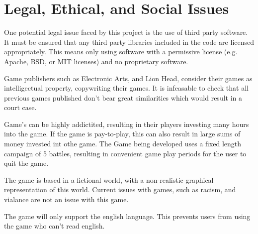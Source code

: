 \section{Legal, Ethical, and Social Issues}
\label{section:professional_issues}

One potential legal issue faced by this project is the use of third party software.
It must be ensured that any third party libraries included in the code are licensed
appropriately. This means only using software with a permissive license (e.g. Apache, BSD, or MIT licenses) and no proprietary software.

Game publishers such as Electronic Arts, and Lion Head, consider their games as intelligectual property, copywriting their games.
It is infeasable to check that all previous games published don't bear great similarities which would result in a court case.

Game's can be highly addictited, resulting in their players investing many hours into the game.
If the game is pay-to-play, this can also result in large sums of money invested int othe game.
The Game being developed uses a fixed length campaign of 5 battles, resulting in convenient game play periods for the user to quit the game.  

The game is based in a fictional world, with a non-realistic graphical representation of this world. Current issues with games, such as racism, and vialance are not an issue with this game.

The game will only support the english language.
This prevents users from using the game who can't read english.


